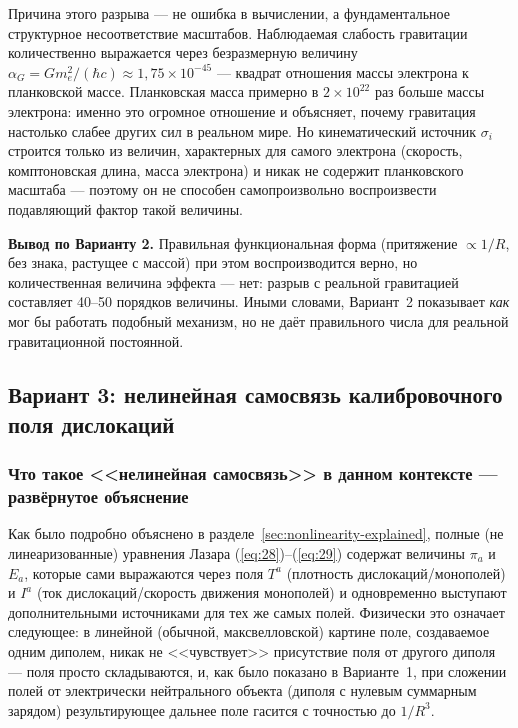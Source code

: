 \documentclass[12pt,a4paper]{article}
\begin{document}
Причина этого разрыва --- не ошибка в вычислении, а фундаментальное
структурное несоответствие масштабов. Наблюдаемая слабость гравитации
количественно выражается через безразмерную величину
$\alpha_G=Gm_e^2/(\hbar c)\approx1{,}75\times10^{-45}$ --- квадрат
отношения массы электрона к планковской массе. Планковская масса
примерно в $2\times10^{22}$ раз больше массы электрона: именно это
огромное отношение и объясняет, почему гравитация настолько слабее
других сил в реальном мире. Но кинематический источник $\sigma_i$
строится только из величин, характерных для самого электрона
(скорость, комптоновская длина, масса электрона) и никак не содержит
планковского масштаба --- поэтому он не способен самопроизвольно
воспроизвести подавляющий фактор такой величины.

\textbf{Вывод по Варианту 2.} Правильная функциональная форма
(притяжение $\propto1/R$, без знака, растущее с массой) при этом
воспроизводится верно, но количественная величина эффекта --- нет:
разрыв с реальной гравитацией составляет 40--50 порядков величины.
Иными словами, Вариант~2 показывает \emph{как} мог бы работать
подобный механизм, но не даёт правильного числа для реальной
гравитационной постоянной.

\subsection{Вариант 3: нелинейная самосвязь калибровочного поля дислокаций}
\label{sec:variant3}

\subsubsection{Что такое <<нелинейная самосвязь>> в данном контексте --- развёрнутое объяснение}

Как было подробно объяснено в разделе~\ref{sec:nonlinearity-explained},
полные (не линеаризованные) уравнения Лазара (\ref{eq:28})--(\ref{eq:29})
содержат величины $\pi_a$ и $E_a$, которые сами выражаются через поля
$T^a$ (плотность дислокаций/монополей) и $I^a$ (ток дислокаций/скорость
движения монополей) и одновременно выступают дополнительными
источниками для тех же самых полей. Физически это означает следующее:
в линейной (обычной, максвелловской) картине поле, создаваемое одним
диполем, никак не <<чувствует>> присутствие поля от другого диполя ---
поля просто складываются, и, как было показано в Варианте~1, при
сложении полей от электрически нейтрального объекта (диполя с нулевым
суммарным зарядом) результирующее дальнее поле гасится с точностью до
$1/R^3$.
\end{document}
